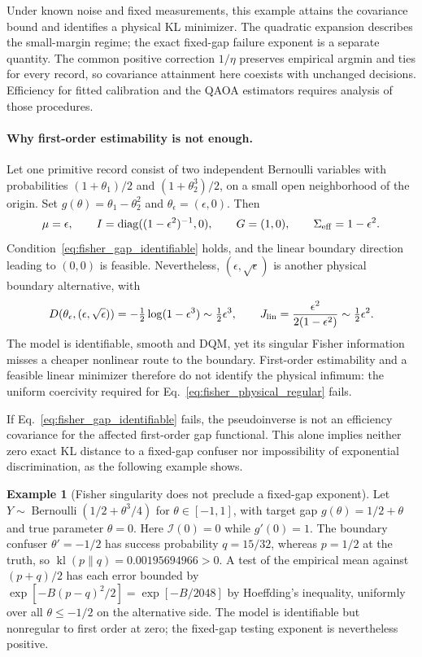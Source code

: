 \documentclass[a4paper,onecolumn,unpublished,nopdfoutputerror]{quantumarticle}
\theoremstyle{plain}
\theoremstyle{definition}
\newtheorem{example}[theorem]{Example}
\newcommand{\diag}{\operatorname{diag}}
\newcommand{\1}{\mathbf{1}}
\newcommand{\kl}{\operatorname{kl}}
\begin{document}
Under known noise and fixed measurements, this example attains the covariance bound and identifies a physical KL minimizer. The quadratic expansion describes the small-margin regime; the exact fixed-gap failure exponent is a separate quantity. The common positive correction $1/\eta$ preserves empirical argmin and ties for every record, so covariance attainment here coexists with unchanged decisions. Efficiency for fitted calibration and the QAOA estimators requires analysis of those procedures.

\paragraph{Why first-order estimability is not enough.}
Let one primitive record consist of two independent Bernoulli variables with probabilities $(1+\theta_1)/2$ and $(1+\theta_2^3)/2$, on a small open neighborhood of the origin. Set $g(\theta)=\theta_1-\theta_2^2$ and $\theta_\epsilon=(\epsilon,0)$. Then
\[
\mu=\epsilon,\qquad I=\diag((1-\epsilon^2)^{-1},0),
\qquad G=(1,0),\qquad \Sigma_{\rm eff}=1-\epsilon^2.
\]
Condition~\eqref{eq:fisher_gap_identifiable} holds, and the linear boundary direction leading to $(0,0)$ is feasible. Nevertheless, $(\epsilon,\sqrt\epsilon)$ is another physical boundary alternative, with
\[
D(\theta_\epsilon,(\epsilon,\sqrt\epsilon))
=-\tfrac12\log(1-\epsilon^3)\sim\tfrac12\epsilon^3,
\qquad J_{\rm lin}=\frac{\epsilon^2}{2(1-\epsilon^2)}\sim\tfrac12\epsilon^2.
\]
The model is identifiable, smooth and DQM, yet its singular Fisher information misses a cheaper nonlinear route to the boundary. First-order estimability and a feasible linear minimizer therefore do not identify the physical infimum: the uniform coercivity required for Eq.~\eqref{eq:fisher_physical_regular} fails.

If Eq.~\eqref{eq:fisher_gap_identifiable} fails, the pseudoinverse is not an efficiency covariance for the affected first-order gap functional. This alone implies neither zero exact KL distance to a fixed-gap confuser nor impossibility of exponential discrimination, as the following example shows.

\begin{example}[Fisher singularity does not preclude a fixed-gap exponent]
Let $Y\sim\operatorname{Bernoulli}(1/2+\theta^3/4)$ for $\theta\in[-1,1]$, with target gap $g(\theta)=1/2+\theta$ and true parameter $\theta=0$.
Here $\mathcal I(0)=0$ while $g'(0)=1$. The boundary confuser $\theta'=-1/2$ has success probability $q=15/32$, whereas $p=1/2$ at the truth, so $\kl(p\|q)=0.00195694966>0$.
A test of the empirical mean against $(p+q)/2$ has each error bounded by
$\exp[-B(p-q)^2/2]=\exp[-B/2048]$ by Hoeffding's inequality, uniformly over all $\theta\le-1/2$ on the alternative side.
The model is identifiable but nonregular to first order at zero; the fixed-gap testing exponent is nevertheless positive.
\end{example}
\end{document}
